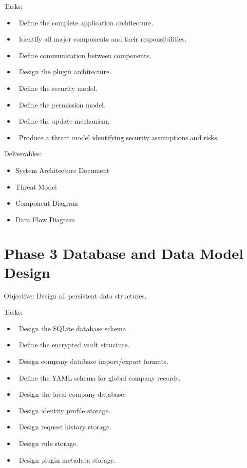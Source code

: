 Tasks:
\begin{itemize}
	\item[] \checkbox\ Define the complete application architecture.
	\item[] \checkbox\ Identify all major components and their responsibilities.
	\item[] \checkbox\ Define communication between components.
	\item[] \checkbox\ Design the plugin architecture.
	\item[] \checkbox\ Define the security model.
	\item[] \checkbox\ Define the permission model.
	\item[] \checkbox\ Define the update mechanism.
	\item[] \checkbox\ Produce a threat model identifying security assumptions and risks.

\end{itemize}

Deliverables:
\begin{itemize}
	\item System Architecture Document
	\item Threat Model
	\item Component Diagram
	\item Data Flow Diagram
\end{itemize}
\section{Phase 3 Database and Data Model Design}
Objective: Design all persistent data structures.

Tasks:
\begin{itemize}
	\item[] \checkbox\ Design the SQLite database schema.
	\item[] \checkbox\ Define the encrypted vault structure.
	\item[] \checkbox\ Design company database import/export formats.
	\item[] \checkbox\ Define the YAML schema for global company records.
	\item[] \checkbox\ Design the local company database.
	\item[] \checkbox\ Design identity profile storage.
	\item[] \checkbox\ Design request history storage.
	\item[] \checkbox\ Design rule storage.
	\item[] \checkbox\ Design plugin metadata storage.
\end{itemize}

